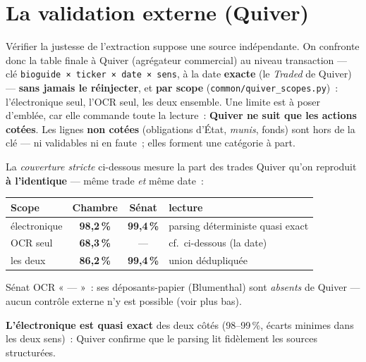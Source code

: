\documentclass[11pt,a4paper]{article}
\newcommand{\co}[1]{\texttt{\small #1}}
\begin{document}
\FloatBarrier

\section{La validation externe (Quiver)}
\label{sec:quiver}

Vérifier la justesse de l'extraction suppose une source indépendante. On confronte donc la table finale à
Quiver (agrégateur commercial) au niveau transaction — clé \co{bioguide × ticker × date × sens}, à la date
\textbf{exacte} (le \emph{Traded} de Quiver) — \textbf{sans jamais le réinjecter}, et \textbf{par scope}
(\co{common/quiver_scopes.py})~: l'électronique seul, l'OCR seul, les deux ensemble. Une limite est à poser
d'emblée, car elle commande toute la lecture~: \textbf{Quiver ne suit que les actions cotées}. Les lignes
\textbf{non cotées} (obligations d'État, \emph{munis}, fonds) sont hors de la clé — ni validables ni en
faute~; elles forment une catégorie à part.

La \emph{couverture stricte} ci-dessous mesure la part des trades Quiver qu'on reproduit \textbf{à
l'identique} — même trade \emph{et} même date~:
\begin{center}\small
\begin{tabular}{l cc l}
\toprule
\bfseries Scope & \bfseries Chambre & \bfseries Sénat & \bfseries lecture\\
\midrule
électronique & \textbf{98,2\,\%} & \textbf{99,4\,\%} & parsing déterministe quasi exact\\
OCR seul & \textbf{68,3\,\%} & — & cf.~ci-dessous (la date) \\
les deux & \textbf{86,2\,\%} & \textbf{99,4\,\%} & union dédupliquée\\
\bottomrule
\end{tabular}
\end{center}
{\footnotesize Sénat OCR « — »~: ses déposants-papier (Blumenthal) sont \emph{absents} de Quiver — aucun
contrôle externe n'y est possible (voir plus bas).}

\textbf{L'électronique est quasi exact} des deux côtés (98--99\,\%, écarts minimes dans les deux sens)~:
Quiver confirme que le parsing lit fidèlement les sources structurées.
\end{document}
